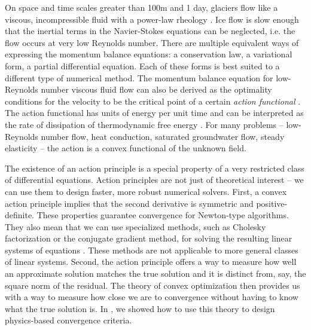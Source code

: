 \documentclass[twocolumn,letterpaper]{igs}
\begin{document}
On space and time scales greater than 100m and 1 day, glaciers flow like a viscous, incompressible fluid with a power-law rheology \citep{greve2009dynamics}.
Ice flow is slow enough that the inertial terms in the Navier-Stokes equations can be neglected, i.e. the flow occurs at very low Reynolds number.
There are multiple equivalent ways of expressing the momentum balance equations: a conservation law, a variational form, a partial differential equation.
Each of these forms is best suited to a different type of numerical method.
The momentum balance equation for low-Reynolds number viscous fluid flow can also be derived as the optimality conditions for the velocity to be the critical point of a certain \emph{action functional} \citep{dukowicz2010consistent}.
The action functional has units of energy per unit time and can be interpreted as the rate of dissipation of thermodynamic free energy \citep{edelen1972nonlinear}.
For many problems -- low-Reynolds number flow, heat conduction, saturated groundwater flow, steady elasticity -- the action is a convex functional of the unknown field.

The existence of an action principle is a special property of a very restricted class of differential equations.
Action principles are not just of theoretical interest -- we can use them to design faster, more robust numerical solvers.
First, a convex action principle implies that the second derivative is symmetric and positive-definite.
These properties guarantee convergence for Newton-type algorithms.
They also mean that we can use specialized methods, such as Cholesky factorization or the conjugate gradient method, for solving the resulting linear systems of equations \citep{nocedal2006numerical}.
These methods are not applicable to more general classes of linear systems.
Second, the action principle offers a way to measure how well an approximate solution matches the true solution and it is distinct from, say, the square norm of the residual.
The theory of convex optimization then provides us with a way to measure how close we are to convergence without having to know what the true solution is.
In \citet{shapero2021icepack}, we showed how to use this theory to design physics-based convergence criteria.
\end{document}
